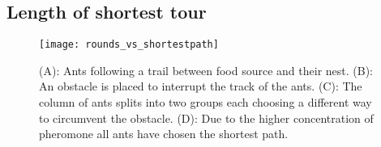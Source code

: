 

\subsection{Length of shortest tour}


\begin{figure}[h!]
\begin{center}
\texttt{[image: rounds\_vs\_shortestpath]}
\caption{(A): Ants following a trail between food source and their nest. (B): An obstacle is placed to interrupt the track of the ants. (C): The column of ants splits into two groups each choosing a different way to circumvent the obstacle. (D): Due to the higher concentration of pheromone all ants have chosen the shortest path.}
\label{fig:ants}
\end{center}
\end{figure}